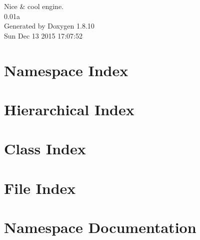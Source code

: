 \documentclass[twoside]{book}
\newcommand{\+}{\discretionary{\mbox{\scriptsize$\hookleftarrow$}}{}{}}
\newcommand{\clearemptydoublepage}{%
  \newpage{\pagestyle{empty}\cleardoublepage}%
}
\begin{document}
\hypersetup{pageanchor=false,
             bookmarks=true,
             bookmarksnumbered=true,
             pdfencoding=unicode
            }
\begin{titlepage}
\vspace*{7cm}
\begin{center}%
{\Large Nice \& cool engine. \\[1ex]\large 0.\+01a }\\
\vspace*{1cm}
{\large Generated by Doxygen 1.8.10}\\
\vspace*{0.5cm}
{\small Sun Dec 13 2015 17:07:52}\\
\end{center}
\end{titlepage}
\clearemptydoublepage
\tableofcontents
\clearemptydoublepage
{}
\hypersetup{pageanchor=true}

\chapter{Namespace Index}

\chapter{Hierarchical Index}

\chapter{Class Index}

\chapter{File Index}

\chapter{Namespace Documentation}

\end{document}
